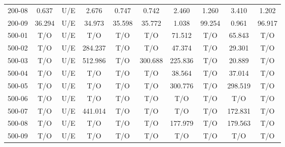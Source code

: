 \begin{table}[H]
{\begin{tabular}{lccccccccc}
        200-08 & 0.637 & U/E & 2.676 & 0.747 & 0.742 & 2.460 & 1.260 & 3.410 & 1.202 \\
        200-09 & 36.294 & U/E & 34.973 & 35.598 & 35.772 & 1.038 & 99.254 & 0.961 & 96.917 \\
        500-01 & T/O & U/E & T/O & T/O & T/O & 71.512 & T/O & 65.843 & T/O \\
        500-02 & T/O & U/E & 284.237 & T/O & T/O & 47.374 & T/O & 29.301 & T/O \\
        500-03 & T/O & U/E & 512.986 & T/O & 300.688 & 225.836 & T/O & 20.889 & T/O \\
        500-04 & T/O & U/E & T/O & T/O & T/O & 38.564 & T/O & 37.014 & T/O \\
        500-05 & T/O & U/E & T/O & T/O & T/O & 300.776 & T/O & 298.519 & T/O \\
        500-06 & T/O & U/E & T/O & T/O & T/O & T/O & T/O & T/O & T/O \\
        500-07 & T/O & U/E & 441.014 & T/O & T/O & T/O & T/O & 172.831 & T/O \\
        500-08 & T/O & U/E & T/O & T/O & T/O & 177.979 & T/O & 179.563 & T/O \\
        500-09 & T/O & U/E & T/O & T/O & T/O & T/O & T/O & T/O & T/O \\
        \bottomrule
    \end{tabular}
    }
\end{table}